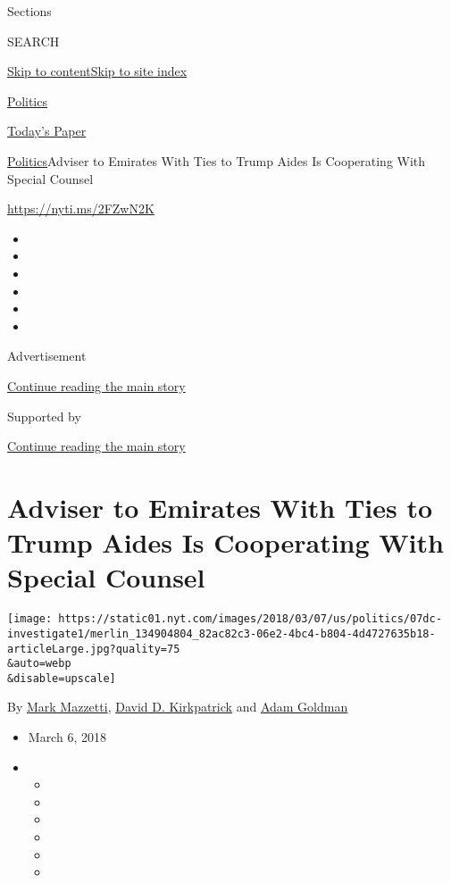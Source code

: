 Sections

SEARCH

\protect\hyperlink{site-content}{Skip to
content}\protect\hyperlink{site-index}{Skip to site index}

\href{https://www.nytimes.com/section/politics}{Politics}

\href{https://myaccount.nytimes.com/auth/login?response_type=cookie\&client_id=vi}{}

\href{https://www.nytimes.com/section/todayspaper}{Today's Paper}

\href{/section/politics}{Politics}\textbar{}Adviser to Emirates With
Ties to Trump Aides Is Cooperating With Special Counsel

\url{https://nyti.ms/2FZwN2K}

\begin{itemize}
\item
\item
\item
\item
\item
\item
\end{itemize}

Advertisement

\protect\hyperlink{after-top}{Continue reading the main story}

Supported by

\protect\hyperlink{after-sponsor}{Continue reading the main story}

\hypertarget{adviser-to-emirates-with-ties-to-trump-aides-is-cooperating-with-special-counsel}{%
\section{Adviser to Emirates With Ties to Trump Aides Is Cooperating
With Special
Counsel}\label{adviser-to-emirates-with-ties-to-trump-aides-is-cooperating-with-special-counsel}}

\texttt{[image: https://static01.nyt.com/images/2018/03/07/us/politics/07dc-investigate1/merlin\_134904804\_82ac82c3-06e2-4bc4-b804-4d4727635b18-articleLarge.jpg?quality=75\\\&auto=webp\\\&disable=upscale]}

By \href{https://www.nytimes.com/by/mark-mazzetti}{Mark Mazzetti},
\href{https://www.nytimes.com/by/david-d-kirkpatrick}{David D.
Kirkpatrick} and \href{https://www.nytimes.com/by/adam-goldman}{Adam
Goldman}

\begin{itemize}
\item
  March 6, 2018
\item
  \begin{itemize}
  \item
  \item
  \item
  \item
  \item
  \item
  \end{itemize}
\end{itemize}

